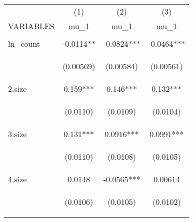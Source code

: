 \documentclass[]{article}
\begin{document}
\begin{center}
\begin{tabular}{lccc} \hline
 & (1) & (2) & (3) \\
VARIABLES & mu\_1 & mu\_1 & mu\_1 \\ \hline
\vspace{4pt} & \begin{footnotesize}\end{footnotesize} & \begin{footnotesize}\end{footnotesize} & \begin{footnotesize}\end{footnotesize} \\
ln\_count & -0.0114** & -0.0824*** & -0.0464*** \\
\vspace{4pt} & \begin{footnotesize}(0.00569)\end{footnotesize} & \begin{footnotesize}(0.00584)\end{footnotesize} & \begin{footnotesize}(0.00561)\end{footnotesize} \\
2.size & 0.159*** & 0.146*** & 0.132*** \\
\vspace{4pt} & \begin{footnotesize}(0.0110)\end{footnotesize} & \begin{footnotesize}(0.0109)\end{footnotesize} & \begin{footnotesize}(0.0104)\end{footnotesize} \\
3.size & 0.131*** & 0.0916*** & 0.0991*** \\
\vspace{4pt} & \begin{footnotesize}(0.0110)\end{footnotesize} & \begin{footnotesize}(0.0108)\end{footnotesize} & \begin{footnotesize}(0.0105)\end{footnotesize} \\
4.size & 0.0148 & -0.0565*** & 0.00614 \\
\vspace{4pt} & \begin{footnotesize}(0.0106)\end{footnotesize} & \begin{footnotesize}(0.0105)\end{footnotesize} & \begin{footnotesize}(0.0102)\end{footnotesize} \\

\end{tabular}
\end{center}
\end{document}
